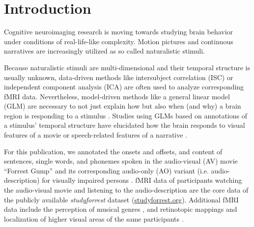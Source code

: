 \documentclass[10pt,a4paper,onecolumn]{article}
\begin{document}
\listoftodos

\clearpage

\section*{Introduction}
Cognitive neuroimaging research is moving towards studying brain behavior
under conditions of real-life-like complexity. Motion pictures \citep{hasson2008neurocinematics} and continuous narratives \citep{honey2012not, lerner2011topographic} are increasingly utilized as so called naturalistic stimuli.

Because naturalistic stimuli are multi-dimensional and their temporal structure
is usually unknown, data-driven methods like intersubject correlation (ISC)\citep{hasson2004intersubject} or independent component analysis
(ICA)\citep{bartels2004chronoarchitecture} are often used to analyze
corresponding fMRI data.
Nevertheless, model-driven methods like a general linear model (GLM) are necessary to not just explain how but also when (and why) a brain region is responding to a stimulus \citep{hamilton2018revolution}.
Studies using GLMs based on annotations of a stimulus' temporal structure have
elucidated how the brain responds to visual features of a movie
\citep{bartels2004mapping} or speech-related features of a narrative
\citep{rocca2019language}.

For this publication, we annotated the onsets and offsets, and content of sentences, single words, and phonemes spoken in the audio-visual (AV) movie ``Forrest Gump'' \citep{ForrestGumpMovie} and its corresponding audio-only (AO) variant (i.e. audio-description) for visually impaired persons \citep{ForrestGumpDVD}.
fMRI data of participants watching the audio-visual movie \citep{hanke2016simultaneous} and listening to the audio-description \citep{hanke2014audiomovie} are the core data of the publicly available \textit{studyforrest} dataset (\href{www.studyforrest.org}{studyforrest.org}).
Additional fMRI data include the perception of musical genres \citep{hanke2015musical}, and retinotopic mappings and localization of higher visual areas of the same participants \citep{sengupta2016extension}.
\end{document}
